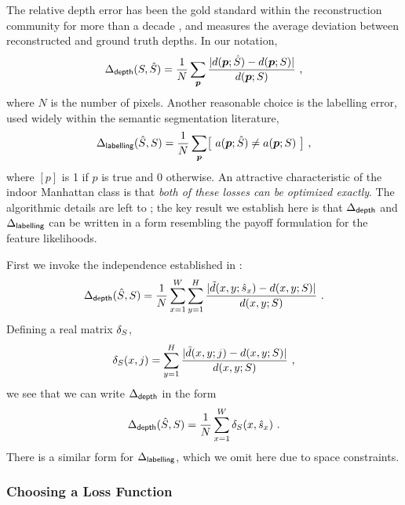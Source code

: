 The relative depth error has been the gold standard within the
reconstruction community for more than a decade \cite{Hartley04}, and
measures the average deviation between reconstructed and ground truth
depths. In our notation,
\begin{equation}
  \label{eq:depth-loss}
  \Delta_{\textsf{depth}}(S,\hat{S})
  =
  \frac{1}{N}
  \sum_{\boldsymbol{p}}
  \frac
      {\lvert d(\boldsymbol{p};\hat{S}) - d(\boldsymbol{p};S)\rvert}
      {d(\boldsymbol{p};S)} ~,
\end{equation}
where $N$ is the number of pixels. Another reasonable choice is the
labelling error, used widely within the semantic segmentation
literature,
\begin{equation}
  \label{eq:label-loss}
  \Delta_{\textsf{labelling}}(\hat{S},S)
  =
  \frac{1}{N}
  \sum_{\boldsymbol{p}}
  \bigl[~a(\boldsymbol{p};\hat{S}) \neq a(\boldsymbol{p};S)~\bigr] ~,
\end{equation}
where $[p]$ is 1 if $p$ is true and 0 otherwise. An attractive
characteristic of the indoor Manhattan class is that \textit{both of
  these losses can be optimized exactly}. The algorithmic details are
left to ; the key result we establish here is that
$\Delta_{\textsf{depth}}$ and $\Delta_{\textsf{labelling}}$ can be written in a form resembling the
payoff formulation  for the feature likelihoods.

First we invoke the independence established in :
\begin{equation}
  \Delta_{\textsf{depth}}(\hat{S},S)
  =
  \frac{1}{N}
  \sum_{x=1}^{W}
  \sum_{y=1}^{H}
  \frac
      {\lvert\tilde{d}(x,y;\hat{s}_x) - d(x,y;S)\rvert}
      {d(x,y;S)} ~.
\end{equation}
Defining a real matrix $\delta_{S}$,
\begin{equation}
  \delta_{S}(x,j) =
  \sum_{y=1}^H
  \frac
      {\lvert\tilde{d}(x,y;j) - d(x,y;S)\rvert}
      {d(x,y;S)} ~,
\end{equation}
we see that we can write $\Delta_{\textsf{depth}}$ in the form
\begin{equation}
  \Delta_{\textsf{depth}}(\hat{S},S)
  =
  \frac{1}{N}
  \sum_{x=1}^{W} \delta_{S}(x,\hat{s}_x) ~.
  \label{eq:depth-loss-matrix}
\end{equation}
There is a similar form for $\Delta_{\textsf{labelling}}$, which we omit here due to
space constraints.

\subsubsection{Choosing a Loss Function}

